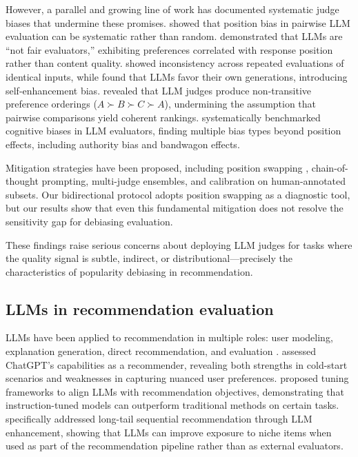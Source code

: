 \documentclass[pdflatex,sn-basic,referee,lineno]{sn-jnl}
\begin{document}
However, a parallel and growing line of work has documented systematic judge biases that undermine these promises. \citet{raina2025judging} showed that position bias in pairwise LLM evaluation can be systematic rather than random. \citet{wang2024large} demonstrated that LLMs are ``not fair evaluators,'' exhibiting preferences correlated with response position rather than content quality. \citet{stureborg2024large} showed inconsistency across repeated evaluations of identical inputs, while \citet{panickssery2024llm} found that LLMs favor their own generations, introducing self-enhancement bias. \citet{liu2025nontransitivity} revealed that LLM judges produce non-transitive preference orderings ($A \succ B \succ C \succ A$), undermining the assumption that pairwise comparisons yield coherent rankings. \citet{koo2024benchmarking} systematically benchmarked cognitive biases in LLM evaluators, finding multiple bias types beyond position effects, including authority bias and bandwagon effects.

Mitigation strategies have been proposed, including position swapping \citep{zheng2023judging}, chain-of-thought prompting, multi-judge ensembles, and calibration on human-annotated subsets. Our bidirectional protocol adopts position swapping as a diagnostic tool, but our results show that even this fundamental mitigation does not resolve the sensitivity gap for debiasing evaluation.

These findings raise serious concerns about deploying LLM judges for tasks where the quality signal is subtle, indirect, or distributional---precisely the characteristics of popularity debiasing in recommendation.

\subsection{LLMs in recommendation evaluation}

LLMs have been applied to recommendation in multiple roles: user modeling, explanation generation, direct recommendation, and evaluation \citep{wu2024survey}. \citet{dai2023uncovering} assessed ChatGPT's capabilities as a recommender, revealing both strengths in cold-start scenarios and weaknesses in capturing nuanced user preferences. \citet{bao2023tallrec} proposed tuning frameworks to align LLMs with recommendation objectives, demonstrating that instruction-tuned models can outperform traditional methods on certain tasks. \citet{liu2024llmesr} specifically addressed long-tail sequential recommendation through LLM enhancement, showing that LLMs can improve exposure to niche items when used as part of the recommendation pipeline rather than as external evaluators.
\end{document}

